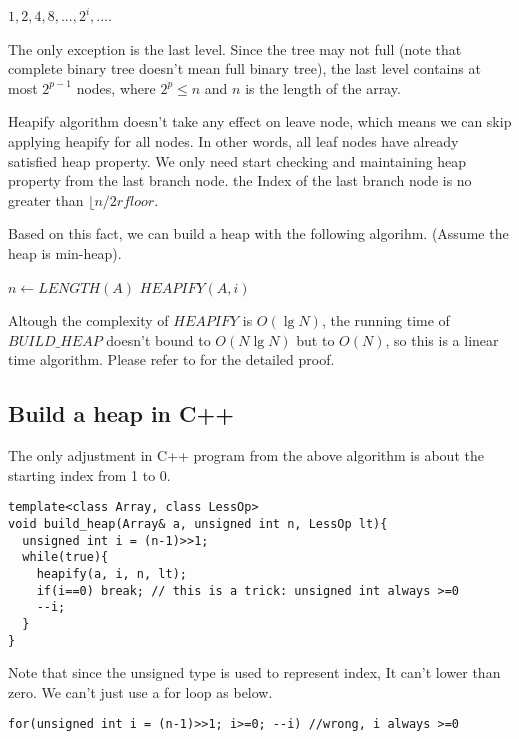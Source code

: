 \documentclass{article}
\begin{document}
$1, 2, 4, 8, ..., 2^i, ...$.

The only exception is the last level. Since the tree may not full
(note that complete binary tree doesn't mean full binary tree), the
last level contains at most $2^{p-1}$ nodes, where $2^p \leq n$ and $n$
is the length of the array.

Heapify algorithm doesn't take any effect on leave node, which means
we can skip applying heapify for all nodes. In other words,  
all leaf nodes have already satisfied heap property. We only need 
start checking and maintaining heap property from the last branch node.
the Index of the last branch node is no greater than $\lfloor n/2 rfloor$.

Based on this fact, we can build a heap with the following algorihm.
(Assume the heap is min-heap).

\begin{algorithmic}[1]
  \State $n \gets LENGTH(A)$
    \State $HEAPIFY(A, i)$
  \EndFor
\EndFunction
\end{algorithmic}

Altough the complexity of $HEAPIFY$ is $O(\lg{N})$, the running time
of $BUILD\_HEAP$ doesn't bound to $O(N \lg{N})$ but to $O(N)$, so this
is a linear time algorithm. Please refer to \cite{CLRS} for the 
detailed proof.

\subsection*{Build a heap in C++}

The only adjustment in C++ program from the above algorithm is
about the starting index from 1 to 0. 

\lstset{language=C++}
\begin{lstlisting}
template<class Array, class LessOp>
void build_heap(Array& a, unsigned int n, LessOp lt){
  unsigned int i = (n-1)>>1;
  while(true){
    heapify(a, i, n, lt);
    if(i==0) break; // this is a trick: unsigned int always >=0
    --i;
  }
}
\end{lstlisting}

Note that since the unsigned type is used to represent index,
It can't lower than zero. We can't just use a for loop as below.

\begin{lstlisting}
for(unsigned int i = (n-1)>>1; i>=0; --i) //wrong, i always >=0
\end{lstlisting}
\end{document}
